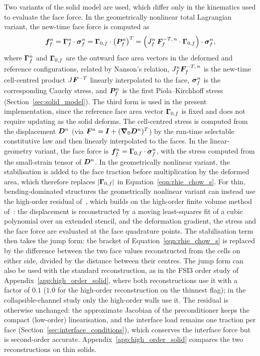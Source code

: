 Two variants of the solid model are used, which differ only in the kinematics used to evaluate the face force.
In the geometrically nonlinear total Lagrangian variant, the new-time face force is computed as
\begin{equation}
\boldsymbol{f}_f^{n}
= \boldsymbol{\Gamma}_f^{n} \cdot \boldsymbol{\sigma}_f^{n}
= \boldsymbol{\Gamma}_{0,f} \cdot \left(\boldsymbol{P}_f^{n}\right)^T
= \left(J_f^{n}\, \boldsymbol{F}_f^{-T,\,n} \cdot \boldsymbol{\Gamma}_{0,f}\right) \cdot \boldsymbol{\sigma}_f^{n},
\label{eqn:face_force}
\end{equation}
where $\boldsymbol{\Gamma}_f^{n}$ and $\boldsymbol{\Gamma}_{0,f}$ are the outward face area vectors in the deformed and reference configurations, related by Nanson's relation, $J_f^{n}\boldsymbol{F}_f^{-T,\,n}$ is the new-time cell-centred product $J\boldsymbol{F}^{-T}$ linearly interpolated to the face, $\boldsymbol{\sigma}_f^{n}$ is the corresponding Cauchy stress, and $\boldsymbol{P}_f^{n}$ is the first Piola--Kirchhoff stress (Section~\ref{sec:solid_model}). The third form is used in the present implementation, since the reference face area vector $\boldsymbol{\Gamma}_{0,f}$ is fixed and does not require updating as the solid deforms.
The cell-centred stress is computed from the displacement $\boldsymbol{D}^{n}$ (via $\boldsymbol{F}^{n} = \boldsymbol{I} + (\boldsymbol{\nabla}_0\boldsymbol{D}^n)^T$) by the run-time selectable constitutive law and then linearly interpolated to the faces.
In the linear-geometry variant, the face force is $\boldsymbol{f}_f^{n} = \boldsymbol{\Gamma}_{0,f} \cdot \boldsymbol{\sigma}_f^{n}$, with the stress computed from the small-strain tensor of $\boldsymbol{D}^n$.
In the geometrically nonlinear variant, the stabilisation is added to the face traction before multiplication by the deformed area, which therefore replaces $|\boldsymbol{\Gamma}_{0,f}|$ in Equation~\eqref{eqn:rhie_chow_s}.
For thin, bending-dominated structures the geometrically nonlinear variant can instead use the high-order residual of~\citet{Batistic2026}, which builds on the high-order finite volume method of~\citet{Castrillo2024}: the displacement is reconstructed by a moving least-squares fit of a cubic polynomial over an extended stencil, and the deformation gradient, the stress and the face force are evaluated at the face quadrature points.
The stabilisation term then takes the jump form: the bracket of Equation~\eqref{eqn:rhie_chow_s} is replaced by the difference between the two face values reconstructed from the cells on either side, divided by the distance between their centres.
The jump form can also be used with the standard reconstruction, as in the FSI3 order study of Appendix~\ref{app:high_order_solid}, where both reconstructions use it with a factor of $0.1$ ($1.0$ for the high-order reconstruction on the thinnest flag); in the collapsible-channel study only the high-order walls use it.
The residual is otherwise unchanged: the approximate Jacobian of the preconditioner keeps the compact (low-order) linearisation, and the interface load remains one traction per face (Section~\ref{sec:interface_conditions}), which conserves the interface force but is second-order accurate.
Appendix~\ref{app:high_order_solid} compares the two reconstructions on thin solids.

